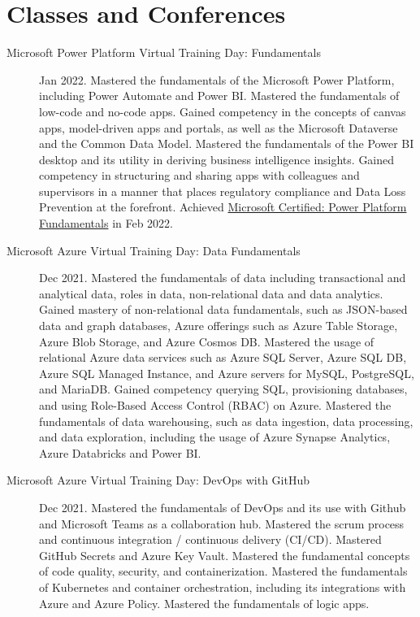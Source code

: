 \documentclass{article}
\begin{document}
\vspace{-1em}
\section*{Classes and Conferences}\vspace{-0.5em}
\begin{description}
  \item [Microsoft Power Platform Virtual Training Day: Fundamentals] Jan 2022. Mastered the fundamentals of the Microsoft Power Platform, including Power Automate and Power BI. Mastered the fundamentals of low-code and no-code apps. Gained competency in the concepts of canvas apps, model-driven apps and portals, as well as the Microsoft Dataverse and the Common Data Model. Mastered the fundamentals of the Power BI desktop and its utility in deriving business intelligence insights. Gained competency in structuring and sharing apps with colleagues and supervisors in a manner that places regulatory compliance and Data Loss Prevention at the forefront. Achieved \href{https://www.credly.com/badges/eeabb8f3-4c51-431e-9174-1528f4ecd6d3/public_url}{Microsoft Certified: Power Platform Fundamentals} in Feb 2022.
  \item [Microsoft Azure Virtual Training Day: Data Fundamentals] Dec 2021. Mastered the fundamentals of data including transactional and analytical data, roles in data, non-relational data and data analytics. Gained mastery of non-relational data fundamentals, such as JSON-based data and graph databases, Azure offerings such as Azure Table Storage, Azure Blob Storage, and Azure Cosmos DB. Mastered the usage of relational Azure data services such as Azure SQL Server, Azure SQL DB, Azure SQL Managed Instance, and Azure servers for MySQL, PostgreSQL, and MariaDB. Gained competency querying SQL, provisioning databases, and using Role-Based Access Control (RBAC) on Azure. Mastered the fundamentals of data warehousing, such as data ingestion, data processing, and data exploration, including the usage of Azure Synapse Analytics, Azure Databricks and Power BI.
  \item [Microsoft Azure Virtual Training Day: DevOps with GitHub] Dec 2021. Mastered the fundamentals of DevOps and its use with Github and Microsoft Teams as a collaboration hub. Mastered the scrum process and continuous integration / continuous delivery (CI/CD). Mastered GitHub Secrets and Azure Key Vault. Mastered the fundamental concepts of code quality, security, and containerization. Mastered the fundamentals of Kubernetes and container orchestration, including its integrations with Azure and Azure Policy. Mastered the fundamentals of logic apps.

\end{description}
\end{document}
